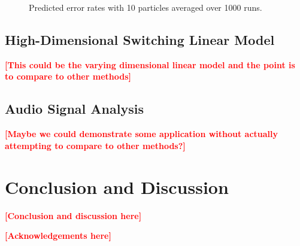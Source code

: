 \documentclass[twocolumn]{autart}    %
\newcommand{\comment}[1]{\textcolor{red}{\textbf{[#1]}}}
\begin{document}
\begin{figure}[htb]
\begin{center}
\end{center}
\caption{Predicted error rates with 10 particles averaged over 1000
  runs.}
\label{fig:10_errp}
\end{figure}


\subsection{High-Dimensional Switching Linear Model}

\comment{This could be the varying dimensional linear model and the
point is to compare to other methods}

\subsection{Audio Signal Analysis}

\comment{Maybe we could demonstrate some application without actually
attempting to compare to other methods?}


\section{Conclusion and Discussion}

\comment{Conclusion and discussion here}



\begin{ack}                               %
\comment{Acknowledgements here}
\end{ack}

\end{document}
